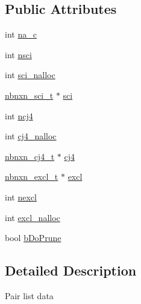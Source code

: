 \subsection*{\-Public \-Attributes}
\begin{DoxyCompactItemize}
\item 
int \hyperlink{structcu__plist_a0d8047be1294a941c932216457eb6467}{na\-\_\-c}
\item 
int \hyperlink{structcu__plist_a9cd013d2e3cd82f6e4d93728ec2455e3}{nsci}
\item 
int \hyperlink{structcu__plist_a0037c494d380de4f2e54826e88a91229}{sci\-\_\-nalloc}
\item 
\hyperlink{structnbnxn__sci__t}{nbnxn\-\_\-sci\-\_\-t} $\ast$ \hyperlink{structcu__plist_ae3f14dcf2b650aa235f07322108fa2dd}{sci}
\item 
int \hyperlink{structcu__plist_a561bbcce3f9536e7e795584996b8d4dc}{ncj4}
\item 
int \hyperlink{structcu__plist_ad6e7a07acdc08375d8e99ea9ac122809}{cj4\-\_\-nalloc}
\item 
\hyperlink{structnbnxn__cj4__t}{nbnxn\-\_\-cj4\-\_\-t} $\ast$ \hyperlink{structcu__plist_a858a7a5bafbd63c0dd5306aa08841101}{cj4}
\item 
\hyperlink{structnbnxn__excl__t}{nbnxn\-\_\-excl\-\_\-t} $\ast$ \hyperlink{structcu__plist_a5e2f9a5ac82605cb77774a1898b01b72}{excl}
\item 
int \hyperlink{structcu__plist_ae2a1755fcfcd06a5da1acfde67673b65}{nexcl}
\item 
int \hyperlink{structcu__plist_a1d1ac80f9396bcc0541eb9d43b2510b2}{excl\-\_\-nalloc}
\item 
bool \hyperlink{structcu__plist_a016ba249a9cf8810627b3e8457e2fe82}{b\-Do\-Prune}
\end{DoxyCompactItemize}


\subsection{\-Detailed \-Description}
\-Pair list data 


